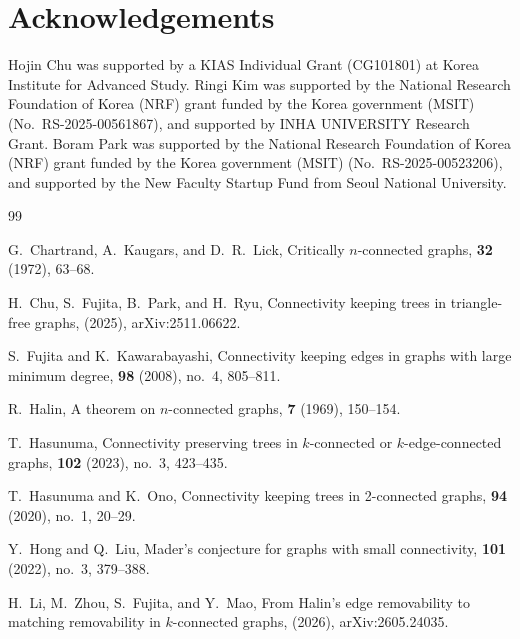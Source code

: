 \documentclass[11pt]{article}
\numberwithin{equation}{section}
\begin{document}
 



\section*{Acknowledgements}
Hojin Chu was supported by a KIAS Individual Grant (CG101801) at Korea Institute
for Advanced Study.
Ringi Kim was supported by the National Research Foundation of Korea (NRF) grant
funded by the Korea government (MSIT) (No.~RS-2025-00561867), and supported by
INHA UNIVERSITY Research Grant.
Boram Park was supported by the National Research Foundation of Korea (NRF) grant
funded by the Korea government (MSIT) (No.~RS-2025-00523206), and supported by the
New Faculty Startup Fund from Seoul National University.

\begin{thebibliography}{99}

G.~Chartrand, A.~Kaugars, and D.~R.~Lick,
\newblock Critically $n$-connected graphs,
 \textbf{32} (1972), 63--68.

H.~Chu, S.~Fujita, B.~Park, and H.~Ryu,
\newblock Connectivity keeping trees in triangle-free graphs,
 (2025), arXiv:2511.06622.

S.~Fujita and K.~Kawarabayashi,
\newblock Connectivity keeping edges in graphs with large minimum degree,
 \textbf{98} (2008), no.~4, 805--811.

R.~Halin,
\newblock A theorem on $n$-connected graphs,
 \textbf{7} (1969), 150--154.

T.~Hasunuma,
\newblock Connectivity preserving trees in $k$-connected or $k$-edge-connected graphs,
 \textbf{102} (2023), no.~3, 423--435.

T.~Hasunuma and K.~Ono,
\newblock Connectivity keeping trees in 2-connected graphs,
 \textbf{94} (2020), no.~1, 20--29.

Y.~Hong and Q.~Liu,
\newblock Mader's conjecture for graphs with small connectivity,
 \textbf{101} (2022), no.~3, 379--388.


H.~Li, M.~Zhou, S.~Fujita, and Y.~Mao,
\newblock From Halin's edge removability to matching removability in $k$-connected graphs,
 (2026), arXiv:2605.24035.


\end{thebibliography}
\end{document}
